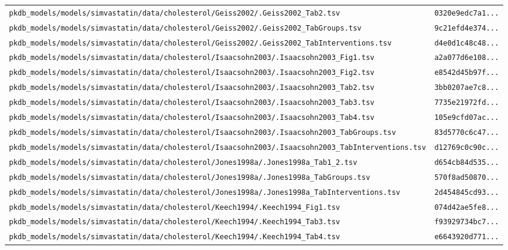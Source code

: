 \begin{longtable}{ll}
\texttt{pkdb\_models/models/simvastatin/data/cholesterol/Geiss2002/.Geiss2002\_Tab2.tsv} & \texttt{0320e9edc7a1...} \\
\texttt{pkdb\_models/models/simvastatin/data/cholesterol/Geiss2002/.Geiss2002\_TabGroups.tsv} & \texttt{9c21efd4e374...} \\
\texttt{pkdb\_models/models/simvastatin/data/cholesterol/Geiss2002/.Geiss2002\_TabInterventions.tsv} & \texttt{d4e0d1c48c48...} \\
\texttt{pkdb\_models/models/simvastatin/data/cholesterol/Isaacsohn2003/.Isaacsohn2003\_Fig1.tsv} & \texttt{a2a077d6e108...} \\
\texttt{pkdb\_models/models/simvastatin/data/cholesterol/Isaacsohn2003/.Isaacsohn2003\_Fig2.tsv} & \texttt{e8542d45b97f...} \\
\texttt{pkdb\_models/models/simvastatin/data/cholesterol/Isaacsohn2003/.Isaacsohn2003\_Tab2.tsv} & \texttt{3bb0207ae7c8...} \\
\texttt{pkdb\_models/models/simvastatin/data/cholesterol/Isaacsohn2003/.Isaacsohn2003\_Tab3.tsv} & \texttt{7735e21972fd...} \\
\texttt{pkdb\_models/models/simvastatin/data/cholesterol/Isaacsohn2003/.Isaacsohn2003\_Tab4.tsv} & \texttt{105e9cfd07ac...} \\
\texttt{pkdb\_models/models/simvastatin/data/cholesterol/Isaacsohn2003/.Isaacsohn2003\_TabGroups.tsv} & \texttt{83d5770c6c47...} \\
\texttt{pkdb\_models/models/simvastatin/data/cholesterol/Isaacsohn2003/.Isaacsohn2003\_TabInterventions.tsv} & \texttt{d12769c0c90c...} \\
\texttt{pkdb\_models/models/simvastatin/data/cholesterol/Jones1998a/.Jones1998a\_Tab1\_2.tsv} & \texttt{d654cb84d535...} \\
\texttt{pkdb\_models/models/simvastatin/data/cholesterol/Jones1998a/.Jones1998a\_TabGroups.tsv} & \texttt{570f8ad50870...} \\
\texttt{pkdb\_models/models/simvastatin/data/cholesterol/Jones1998a/.Jones1998a\_TabInterventions.tsv} & \texttt{2d454845cd93...} \\
\texttt{pkdb\_models/models/simvastatin/data/cholesterol/Keech1994/.Keech1994\_Fig1.tsv} & \texttt{074d42ae5fe8...} \\
\texttt{pkdb\_models/models/simvastatin/data/cholesterol/Keech1994/.Keech1994\_Tab3.tsv} & \texttt{f93929734bc7...} \\
\texttt{pkdb\_models/models/simvastatin/data/cholesterol/Keech1994/.Keech1994\_Tab4.tsv} & \texttt{e6643920d771...} \\

\end{longtable}
